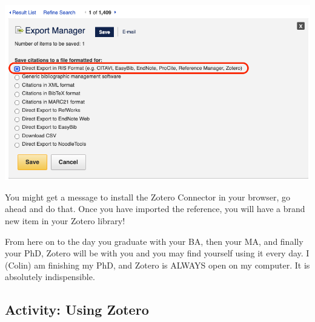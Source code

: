 \documentclass[
]{book}
\theoremstyle{definition}
\theoremstyle{definition}
\theoremstyle{definition}
\theoremstyle{definition}
\theoremstyle{remark}
\begin{document}
\includegraphics{assets/u2/library3.png}

You might get a message to install the Zotero Connector in your browser, go ahead and do that. Once you have imported the reference, you will have a brand new item in your Zotero library!

From here on to the day you graduate with your BA, then your MA, and finally your PhD, Zotero will be with you and you may find yourself using it every day. I (Colin) am finishing my PhD, and Zotero is ALWAYS open on my computer. It is absolutely indispensible.

\hypertarget{activity-using-zotero}{%
\subsection*{Activity: Using Zotero}\label{activity-using-zotero}}
\end{document}
